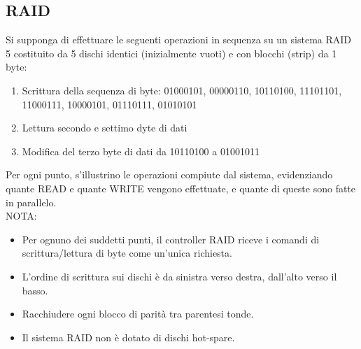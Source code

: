 \documentclass[12pt]{article}
\begin{document}
\subsection{RAID}
Si supponga di effettuare le seguenti operazioni in sequenza su un sistema RAID 5 costituito da 5 dischi identici (inizialmente vuoti) e con blocchi (strip) da 1 byte:
\begin{enumerate}
    \item Scrittura della sequenza di byte: 01000101, 00000110, 10110100, 11101101, 11000111, 10000101, 01110111, 01010101
    \item Lettura secondo e settimo dyte di dati
    \item Modifica del terzo byte di dati da 10110100 a 01001011
\end{enumerate}
Per ogni punto, s'illustrino le operazioni compiute dal sistema, evidenziando quante READ e quante WRITE vengono effettuate, e quante di queste sono fatte in parallelo.\\
NOTA:
\begin{itemize}
    \item Per ognuno dei suddetti punti, il controller RAID riceve i comandi di scrittura/lettura di byte come un'unica richiesta.
    \item L'ordine di scrittura sui dischi è da sinistra verso destra, dall'alto verso il basso.
    \item Racchiudere ogni blocco di parità tra parentesi tonde.
    \item Il sistema RAID non è dotato di dischi hot-spare.\\
\end{itemize}
\end{document}
